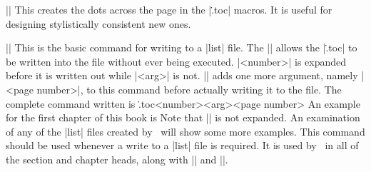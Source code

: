 \mbr
\ext\@|\tocfill|
\nbr
This creates the dots across the page in the |\..toc| macros. It is useful
for designing stylistically consistent new ones.

\mbr
\ext\@||
\nbr
This is the basic command for writing to a |list| file. The |\string|
allows the |\..toc| to be written into the file without ever being executed.
|{<number>}| is expanded before it is written out while |{<arg>}| is not.
|\writelistfile| adds one more argument, namely 
|{<page number>}|,  to this command before actually writing it to the file.
The complete command written is
\begintt
\..toc{<number>}{<arg>}{<page number>}
\endtt
An example for the first chapter of this book is 
\begintt
{}
\endtt
Note that |\tex| is not expanded. 
An examination of any of the |list| files created by \intex\ will show some
more examples.
This command should be used whenever a write to a |list| file is required. It
is used by \intex\ in all of the section and chapter heads, along with
|\figure| and |\table|.

\endblockmode
\ejectpage

\done